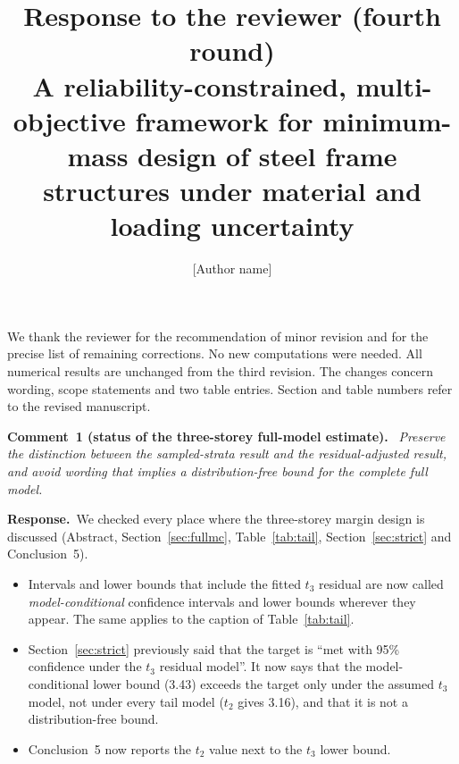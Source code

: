 \documentclass[11pt]{article}
\title{Response to the reviewer (fourth round)\\[0.3em]\large A reliability-constrained, multi-objective
framework for minimum-mass design of steel frame structures under material and loading uncertainty}
\author{[Author name]}
\date{}
\newenvironment{comment}[1]{\par\medskip\noindent\textbf{Comment~#1.}\ \itshape}{\par}
\newcommand{\resp}{\par\noindent\textbf{Response.}\ }
\begin{document}
\maketitle

We thank the reviewer for the recommendation of minor revision and for the precise list of remaining
corrections. No new computations were needed. All numerical results are unchanged from the third
revision. The changes concern wording, scope statements and two table entries. Section and table
numbers refer to the revised manuscript.

\begin{comment}{1 (status of the three-storey full-model estimate)}
Preserve the distinction between the sampled-strata result and the residual-adjusted result, and avoid
wording that implies a distribution-free bound for the complete full model.
\end{comment}
\resp We checked every place where the three-storey margin design is discussed (Abstract,
Section~\ref{sec:fullmc}, Table~\ref{tab:tail}, Section~\ref{sec:strict} and Conclusion~5).
\begin{itemize}[itemsep=0.1em]
\item Intervals and lower bounds that include the fitted $t_3$ residual are now called
\emph{model-conditional} confidence intervals and lower bounds wherever they appear. The same applies
to the caption of Table~\ref{tab:tail}.
\item Section~\ref{sec:strict} previously said that the target is ``met with 95\% confidence under the
$t_3$ residual model''. It now says that the model-conditional lower bound (3.43) exceeds the target
only under the assumed $t_3$ model, not under every tail model ($t_2$ gives 3.16), and that it is not
a distribution-free bound.
\item Conclusion~5 now reports the $t_2$ value next to the $t_3$ lower bound.
\end{itemize}
\end{document}
